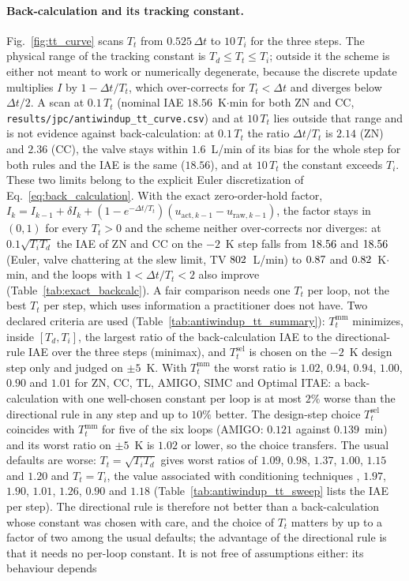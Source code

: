 \documentclass[11pt]{article}
\begin{document}
\paragraph{Back-calculation and its tracking constant.} Fig.~\ref{fig:tt_curve} scans $T_t$ from $0.525\,\Delta t$ to $10\,T_i$ for the three steps. The physical range of the tracking constant is $T_d \le T_t \le T_i$; outside it the scheme is either not meant to work or numerically degenerate, because the discrete update multiplies $I$ by $1 - \Delta t/T_t$, which over-corrects for $T_t < \Delta t$ and diverges below $\Delta t/2$. A scan at $0.1\,T_t$ (nominal IAE $18.56$~K$\cdot$min for both ZN and CC, \texttt{results/jpc/antiwindup\_tt\_curve.csv}) and at $10\,T_t$ lies outside that range and is not evidence against back-calculation: at $0.1\,T_t$ the ratio $\Delta t/T_t$ is $2.14$ (ZN) and $2.36$ (CC), the valve stays within $1.6$~L/min of its bias for the whole step for both rules and the IAE is the same ($18.56$), and at $10\,T_t$ the constant exceeds $T_i$. These two limits belong to the explicit Euler discretization of Eq.~\eqref{eq:back_calculation}. With the exact zero-order-hold factor, $I_k = I_{k-1} + \delta I_k + (1 - e^{-\Delta t/T_t})(u_{\text{act},k-1} - u_{\text{raw},k-1})$, the factor stays in $(0, 1)$ for every $T_t > 0$ and the scheme neither over-corrects nor diverges: at $0.1\sqrt{T_iT_d}$ the IAE of ZN and CC on the $-2$~K step falls from $18.56$ and $18.56$ (Euler, valve chattering at the slew limit, TV $802$~L/min) to $0.87$ and $0.82$~K$\cdot$min, and the loops with $1 < \Delta t/T_t < 2$ also improve (Table~\ref{tab:exact_backcalc}). A fair comparison needs one $T_t$ per loop, not the best $T_t$ per step, which uses information a practitioner does not have. Two declared criteria are used (Table~\ref{tab:antiwindup_tt_summary}): $T_t^{\mathrm{mm}}$ minimizes, inside $[T_d, T_i]$, the largest ratio of the back-calculation IAE to the directional-rule IAE over the three steps (minimax), and $T_t^{\mathrm{sel}}$ is chosen on the $-2$~K design step only and judged on $\pm 5$~K. With $T_t^{\mathrm{mm}}$ the worst ratio is $1.02$, $0.94$, $0.94$, $1.00$, $0.90$ and $1.01$ for ZN, CC, TL, AMIGO, SIMC and Optimal ITAE: a back-calculation with one well-chosen constant per loop is at most $2\%$ worse than the directional rule in any step and up to $10\%$ better. The design-step choice $T_t^{\mathrm{sel}}$ coincides with $T_t^{\mathrm{mm}}$ for five of the six loops (AMIGO: $0.121$ against $0.139$~min) and its worst ratio on $\pm 5$~K is $1.02$ or lower, so the choice transfers. The usual defaults are worse: $T_t = \sqrt{T_iT_d}$ gives worst ratios of $1.09$, $0.98$, $1.37$, $1.00$, $1.15$ and $1.20$ and $T_t = T_i$, the value associated with conditioning techniques \cite{peng1996nonlinear}, $1.97$, $1.90$, $1.01$, $1.26$, $0.90$ and $1.18$ (Table~\ref{tab:antiwindup_tt_sweep} lists the IAE per step). The directional rule is therefore not better than a back-calculation whose constant was chosen with care, and the choice of $T_t$ matters by up to a factor of two among the usual defaults; the advantage of the directional rule is that it needs no per-loop constant. It is not free of assumptions either: its behaviour depends 
\end{document}
